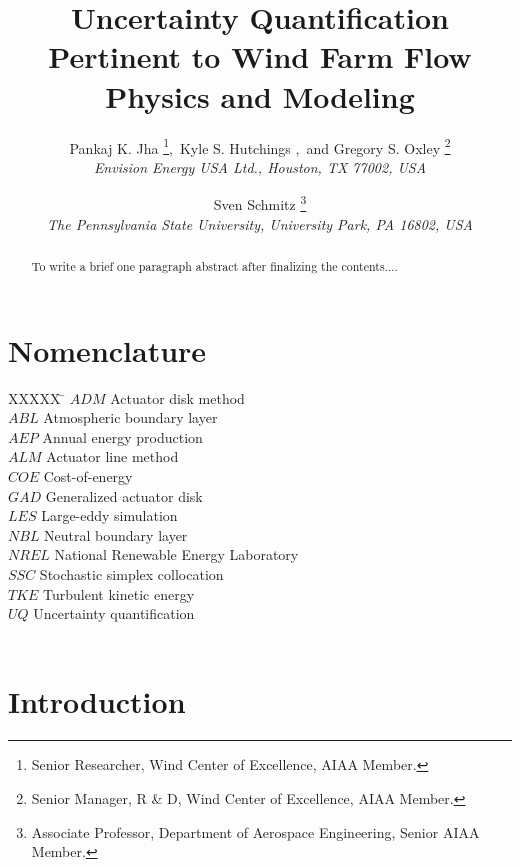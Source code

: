 \documentclass[]{aiaa-tc}%
\title{Uncertainty Quantification Pertinent to Wind Farm Flow Physics and Modeling}
\author{
    Pankaj K. Jha%
    \thanks{Senior Researcher, Wind Center of Excellence, AIAA Member.},\
    Kyle S. Hutchings%
   \thanksibid{1},\ and 
    Gregory S. Oxley%
   \thanks{Senior Manager, R \& D, Wind Center of Excellence, AIAA Member.}\\
  {\normalsize\itshape
   Envision Energy USA Ltd., Houston, TX 77002, USA}\\
  \and
  Sven Schmitz %
   \thanks{Associate Professor, Department of Aerospace Engineering, Senior AIAA Member.}\\
  {\normalsize\itshape
  The Pennsylvania State University, University Park, PA 16802, USA}
 }
\begin{document}
\maketitle

\begin{abstract}
To write a brief one paragraph abstract after finalizing the contents....
\end{abstract}

\section*{Nomenclature}

\begin{tabbing}
  XXXXX \= \kill%
  $ADM$ \> Actuator disk method \\
  $ABL$ \> Atmospheric boundary layer \\
  $AEP$ \> Annual energy production \\
  $ALM$ \> Actuator line method \\
  $COE$ \> Cost-of-energy \\
  $GAD$ \> Generalized actuator disk \\
  $LES$ \> Large-eddy simulation \\
  $NBL$ \> Neutral boundary layer \\
  $NREL$ \> National Renewable Energy Laboratory \\
  $SSC$ \> Stochastic simplex collocation \\
  $TKE$ \> Turbulent kinetic energy \\
  $UQ$ \> Uncertainty quantification \\
  $$ \>
 \end{tabbing}

\section{Introduction}
\end{document}
